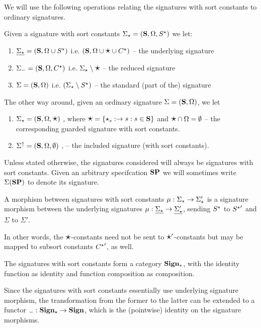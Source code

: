 We will use the following operations relating the signatures with sort
 constants to ordinary signatures.

\begin{definition}\label{def:sigops}
Given a signature with sort constants $\Sigma_\star=({\bf S},\Omega,S^\star)$ we let:
\begin{enumerate}\MyLPar
\item $\underline{\Sigma_\star}=({\bf S},\Omega \cup S^\star)$
i.e. $({\bf S}, \Omega \cup \mbox{\Large{$\star$}} \cup C^\star)$ -- the underlying signature
\item ${\Sigma_-}=({\bf S},\Omega,C^\star)$ i.e. $\Sigma_\star
\setminus \mbox{\Large{$\star$}}$ -- the reduced signature
\item ${\Sigma}=({\bf S},\Omega)$ i.e. $(\Sigma_\star
\setminus S^\star)$ -- the standard (part of the) signature
\end{enumerate}
The other way around, given an ordinary signature $\Sigma=({\bf S},\Omega)$, we let
\begin{enumerate}\MyLPar\setcounter{enumi}{3}
\item ${\Sigma_\star}=({\bf S},\Omega,\mbox{\Large{$\star$}})$
, where   $\mbox{\Large{$\star$}}=\{\star_s:\to s:s\in{\bf S}\}$ and $\mbox{\Large{$\star$}}\cap\Omega=\emptyset$
-- the corresponding guarded signature with sort constants.
\item\label{it:ins} $\Sigma^\uparrow=({\bf S},\Omega,\emptyset)$
, -- the included signature (with sort constants).
\end{enumerate}
\end{definition}
%
Unless stated otherwise, the signatures considered will always be signatures with sort constants. 
Given an arbitrary specifcation ${\bf SP}$ we will sometimes write
$\Sigma({\bf SP})$ to denote its signature.

\begin{definition}
A morphism between signatures with sort constants $\mu:\Sigma_\star \to
\Sigma'_{\star}$ is a signature morphism between the underlying
signatures $\mu:\underline{\Sigma_\star}\to\underline{\Sigma'_\star}$, sending
$S^\star$ to ${S^\star}'$ and $\Sigma$ to $\Sigma'$.
\end{definition}
In other words, the $\mbox{\Large{$\star$}}$-constants need not be sent to $\mbox{\Large{$\star$}}'$-constants
but may be mapped to subsort constants ${C^\star}'$, as well.

\begin{fact}
The signatures with sort constants form a category ${\bf Sign_\star}$, with
the identity function as identity and function composition as composition.
\end{fact}
%
Since the signatures with sort constants essentially use underlying signature
morphism, the transformation from the former to the latter
can be extended to a functor ${\sf {_-}}:{\bf Sign_\star} \to
{\bf Sign}$, which is the (pointwise) identity on the signature morphisms. 

